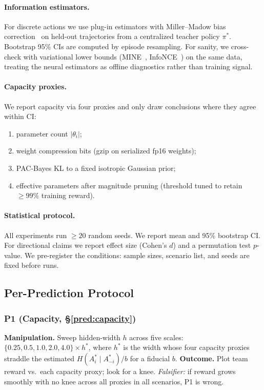 \documentclass[10pt, letterpaper]{article}
\begin{document}
\paragraph{Information estimators.} For discrete actions we use plug-in estimators with Miller--Madow bias correction~\cite{millermadow1955} on held-out trajectories from a centralized teacher policy $\pi^*$. Bootstrap 95\% CIs are computed by episode resampling. For sanity, we cross-check with variational lower bounds (MINE~\cite{belghazi2018mine}, InfoNCE~\cite{oord2018cpc}) on the same data, treating the neural estimators as offline diagnostics rather than training signal.

\paragraph{Capacity proxies.} We report capacity via four proxies and only draw conclusions where they agree within CI:
\begin{enumerate}
    \item parameter count $|\theta_i|$;
    \item weight compression bits (gzip on serialized fp16 weights);
    \item PAC-Bayes KL to a fixed isotropic Gaussian prior;
    \item effective parameters after magnitude pruning (threshold tuned to retain $\geq 99\%$ training reward).
\end{enumerate}

\paragraph{Statistical protocol.} All experiments run $\geq 20$ random seeds. We report mean and 95\% bootstrap CI. For directional claims we report effect size (Cohen's $d$) and a permutation test $p$-value. We pre-register the conditions: sample sizes, scenario list, and seeds are fixed before runs.

\subsection{Per-Prediction Protocol}

\subsubsection*{P1 (Capacity, \S\ref{pred:capacity})}
\textbf{Manipulation.} Sweep hidden-width $h$ across five scales: $\{0.25, 0.5, 1.0, 2.0, 4.0\}\times h^*$, where $h^*$ is the width whose four capacity proxies straddle the estimated $H(A_i^*\mid A_{-i}^*)/b$ for a fiducial $b$.
\textbf{Outcome.} Plot team reward vs.\ each capacity proxy; look for a knee. \emph{Falsifier:} if reward grows smoothly with no knee across all proxies in all scenarios, P1 is wrong.
\end{document}
